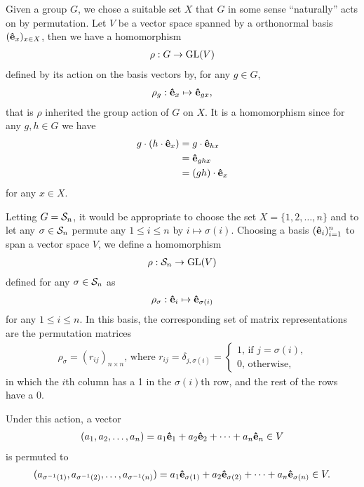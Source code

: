 	Given a group $G$, we chose a suitable set $X$ that $G$ in some sense ``naturally'' acts on by permutation. Let $V$ be a vector space spanned by a orthonormal basis $(\mathbf{\hat{e}}_x)_{x \in X}$, then we have a homomorphism
	\begin{align*}
		\rho:G \rightarrow \text{GL}(V)
	\end{align*} 
	defined by its action on the basis vectors by, for any $g \in G$, 
	\begin{align*}
		\rho_g: \mathbf{\hat{e}}_x \mapsto \mathbf{\hat{e}}_{gx},
	\end{align*}
	that is $\rho$ inherited the group action of $G$ on $X$. It is a homomorphism since for any $g,h \in G$ we have
	\begin{align*}
		g \cdot (h \cdot \mathbf{\hat{e}}_x) &= g \cdot \mathbf{\hat{e}}_{hx} \\
		&= \mathbf{\hat{e}}_{ghx} \\
		&= (gh) \cdot \mathbf{\hat{e}}_x
	\end{align*}
	for any $x \in X$.
	
	Letting $G = \mathcal{S}_n$, it would be appropriate to choose the set $X = \{1, 2, \dots, n\}$ and to let any $\sigma \in \mathcal{S}_n$ permute any $1 \leq i \leq n$ by $i \mapsto \sigma(i)$. Choosing a basis $(\mathbf{\hat{e}}_i)_{i=1}^n$ to span a vector space $V$, we define a homomorphism
	\begin{align*}
		\rho: \mathcal{S}_n \rightarrow \text{GL}(V)
	\end{align*}
	defined for any $\sigma \in \mathcal{S}_n$ as
	\begin{align*}
		\rho_\sigma: \mathbf{\hat{e}}_i \mapsto \mathbf{\hat{e}}_{\sigma(i)}
	\end{align*}
	for any $1 \leq i \leq n$. In this basis, the corresponding set of matrix representations are the permutation matrices
	\begin{align*}
		\rho_\sigma = (r_{ij})_{n \times n} \text{, where } r_{ij} = \delta_{j,\sigma(i)} = \begin{cases}
			1 \text{, if $j = \sigma(i)$,} \\
			0 \text{, otherwise,}
		\end{cases}
	\end{align*}
	in which the $i$th column has a 1 in the $\sigma(i)$th row, and the rest of the rows have a 0.
	
	Under this action, a vector
	\begin{align*}
		(a_1, a_2, \dots, a_n) = a_1 \mathbf{\hat{e}}_1 + a_2 \mathbf{\hat{e}}_2 + \dots + a_n \mathbf{\hat{e}}_n \in V
	\end{align*}
	is permuted to 
	\begin{align*}
		(a_{\sigma^{-1}(1)}, a_{\sigma^{-1}(2)}, \dots, a_{\sigma^{-1}(n)}) = a_1 \mathbf{\hat{e}}_{\sigma(1)} + a_2 \mathbf{\hat{e}}_{\sigma(2)} + \dots + a_n \mathbf{\hat{e}}_{\sigma(n)}  \in V.
	\end{align*}
	
